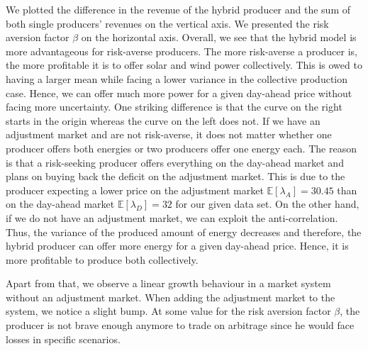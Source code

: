 We plotted the difference in the revenue of the hybrid producer and the sum of both single producers' revenues on the vertical axis. We presented the risk aversion factor $\beta$ on the horizontal axis. Overall, we see that the hybrid model is more advantageous for risk-averse producers. The more risk-averse a producer is, the more profitable it is to offer solar and wind power collectively. This is owed to having a larger mean while facing a lower variance in the collective production case. Hence, we can offer much more power for a given day-ahead price without facing more uncertainty. One striking difference is that the curve on the right starts in the origin whereas the curve on the left does not. If we have an adjustment market and are not risk-averse, it does not matter whether one producer offers both energies or two producers offer one energy each. The reason is that a risk-seeking producer offers everything on the day-ahead market and plans on buying back the deficit on the adjustment market. This is due to the producer expecting a lower price on the adjustment market $\mathbb{E}[\lambda_A]=30.45$ than on the day-ahead market $\mathbb{E}[\lambda_D]=32$ for our given data set.
On the other hand, if we do not have an adjustment market, we can exploit the anti-correlation. Thus, the variance of the produced amount of energy decreases and therefore, the hybrid producer can offer more energy for a given day-ahead price. Hence, it is more profitable to produce both collectively. 

Apart from that, we observe a linear growth behaviour in a market system without an adjustment market. When adding the adjustment market to the system, we notice a slight bump. At some value for the risk aversion factor $\beta$, the producer is not brave enough anymore to trade on arbitrage since he would face losses in specific scenarios. 

